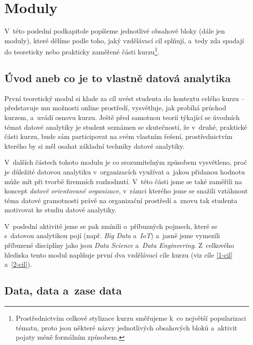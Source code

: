 \hypertarget{moduly}{%
\section{Moduly}\label{moduly}}

V~této poslední podkapitole popíšeme jednotlivé obsahové bloky (dále jen moduly), které dělíme podle toho, jaký vzdělávací cíl splňují, a~tedy zda spadají do teoreticky nebo prakticky zaměřené části kurzu\footnote{Prostřednictvím celkové stylizace kurzu směřujeme k~co největší popularizaci tématu, proto jsou některé názvy jednotlivých obsahových bloků a~aktivit pojaty méně formálním způsobem.}.

\hypertarget{uxfavod-aneb-co-je-to-vlastnux11b-datovuxe1-analytika}{%
\subsection{Úvod aneb co je to vlastně datová analytika}\label{uxfavod-aneb-co-je-to-vlastnux11b-datovuxe1-analytika}}

První teoretický modul si klade za cíl uvést studenta do kontextu celého kurzu -- představuje mu možnosti online prostředí, vysvětluje, jak probíhá průchod kurzem, a~uvádí osnovu kurzu. Ještě před samotnou teorií týkající se úvodních témat datové analytiky je student seznámen se skutečností, že v~druhé, praktické části kurzu, bude sám participovat na svém vlastním řešení, prostřednictvím kterého by si měl osahat základní techniky datové analytiky.

V~dalších částech tohoto modulu je co srozumitelným způsobem vysvětleno, proč je důležité datovou analytiku v~organizacích využívat a~jakou přidanou hodnotu může mít při tvorbě firemních rozhodnutí. V~této části jsme se také zaměřili na koncept \emph{datově orientované organizace}, v~rámci kterého jsme se snažili vztáhnout téma datové gramotnosti právě na organizační prostředí a~znovu tak studenta motivovat ke studiu datové analytiky.

V~poslední aktivitě jsme se pak zmínili o~příbuzných pojmech, které se s~datovou analytikou pojí (např. \emph{Big Data} a~\emph{IoT}) a~jasně jsme vymezili příbuzené disciplíny jako jsou \emph{Data Science} a~\emph{Data Engineering}. Z~celkového hlediska tento modul naplňuje první dva vzdělávací cíle kurzu (viz cíle \ref{1-cil} a~\ref{2-cil}).

\hypertarget{data-data-a-zase-data}{%
\subsection{Data, data a~zase data}\label{data-data-a-zase-data}}

